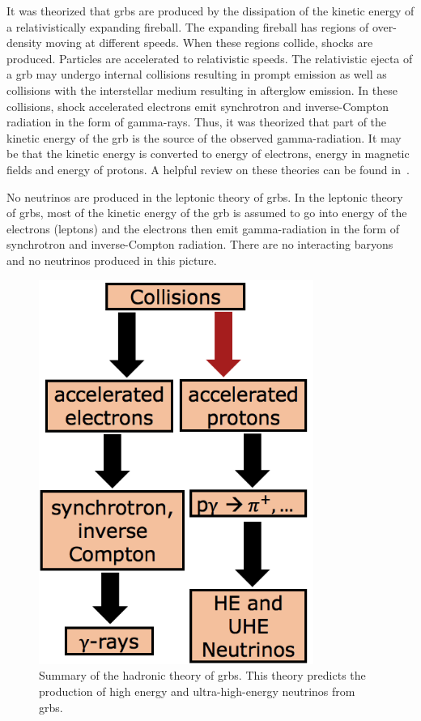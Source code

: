 It was theorized that \gls{grbs} are produced by the dissipation of the kinetic energy of a relativistically expanding fireball. The expanding fireball has regions of over-density moving at different speeds. When these regions collide, shocks are produced. Particles are accelerated to relativistic speeds. The relativistic ejecta of a \gls{grb} may undergo internal collisions resulting in prompt emission as well as collisions with the interstellar medium resulting in afterglow emission. In these collisions, shock accelerated electrons emit synchrotron and inverse-Compton radiation in the form of gamma-rays. Thus, it was theorized that part of the kinetic energy of the \gls{grb} is the source of the observed gamma-radiation. It may be that the kinetic energy is converted to energy of electrons, energy in magnetic fields and energy of protons. A helpful review on these theories can be found in~\cite{Meszaros}.

No neutrinos are produced in the leptonic theory of \gls{grbs}. In the leptonic theory of \gls{grbs}, most of the kinetic energy of the \gls{grb} is assumed to go into energy of the electrons (leptons) and the electrons then emit gamma-radiation in the form of synchrotron and inverse-Compton radiation. There are no interacting baryons and no neutrinos produced in this picture. 

\begin{figure}
\centering
\includegraphics[width=0.8\textwidth]{figures/grb_hadronic.png}
\caption{Summary of the hadronic theory of \gls{grbs}. This theory predicts the production of high energy and ultra-high-energy neutrinos from \gls{grbs}.}
\label{grb_hadronic}
\end{figure}


